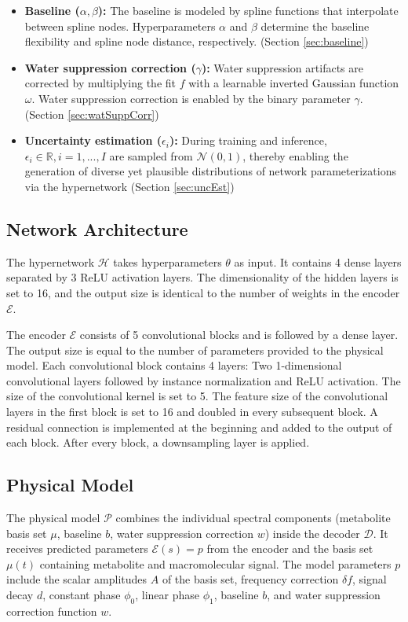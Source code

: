 \documentclass{article}
\begin{document}
        \begin{itemize}
            \item \textbf{Baseline ($\alpha,\beta$):} The baseline is modeled by spline functions that interpolate between spline nodes. Hyperparameters $\alpha$ and $\beta$ determine the baseline flexibility and spline node distance, respectively. (Section \ref{sec:baseline})
            \item \textbf{Water suppression correction ($\gamma$):} Water suppression artifacts are corrected by multiplying the fit $f$ with a learnable inverted Gaussian function $\omega$. Water suppression correction is enabled by the binary parameter $\gamma$. (Section \ref{sec:watSuppCorr})
            \item \textbf{Uncertainty estimation ($\epsilon_i$):} During training and inference, $\epsilon_i \in \mathbb{R}, i=1,...,I$ are sampled from $\mathcal{N}(0,1)$, thereby enabling the generation of diverse yet plausible distributions of network parameterizations via the hypernetwork (Section \ref{sec:uncEst})
        \end{itemize} 
        

    \subsection{Network Architecture}
        The hypernetwork $\mathcal{H}$ takes hyperparameters $\theta$ as input. It contains 4 dense layers separated by 3 ReLU activation layers. The dimensionality of the hidden layers is set to 16, and the output size is identical to the number of weights in the encoder $\mathcal{E}$.

        The encoder $\mathcal{E}$ consists of 5 convolutional blocks and is followed by a dense layer. The output size is equal to the number of parameters provided to the physical model. Each convolutional block contains 4 layers: Two 1-dimensional convolutional layers followed by instance normalization and ReLU activation. The size of the convolutional kernel is set to 5. The feature size of the convolutional layers in the first block is set to 16 and doubled in every subsequent block. A residual connection is implemented at the beginning and added to the output of each block. After every block, a downsampling layer is applied.
        
    \subsection{Physical Model}
        The physical model $\mathcal{P}$ combines the individual spectral components (metabolite basis set $\mu$, baseline $b$, water suppression correction $w$) inside the decoder $\mathcal{D}$. It receives predicted parameters $\mathcal{E}(s)=p$ from the encoder and the basis set $\mu(t)$ containing metabolite and macromolecular signal. The model parameters $p$ include the scalar amplitudes $A$ of the basis set, frequency correction $\delta f$,  signal decay $d$, constant phase $\phi_0$, linear phase $\phi_1$, baseline $b$, and water suppression correction function $w$. 
\end{document}

